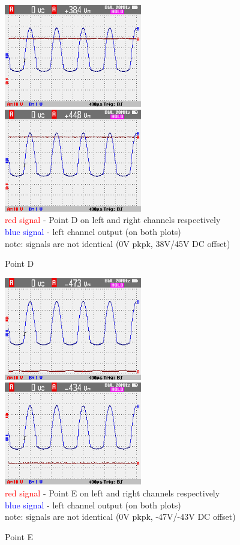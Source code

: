 \documentclass[a4paper,twoside,notitlepage]{article}
\begin{document}
\begin{figure}[hptb!]
    \centering
    \includegraphics[width=6cm]{img_report/left_point_D.png}
    \includegraphics[width=6cm]{img_report/right_point_D.png} \\ 
    \textcolor{Red}{red signal} - Point D on left and right channels respectively \\
    \textcolor{Blue}{blue signal} - left channel output (on both plots) \\
    note: signals are not identical (0V pkpk, 38V/45V DC offset)
 \caption{Point D}
 \label{fig:point-D}
\end{figure}

\begin{figure}[hptb!]
    \centering
    \includegraphics[width=6cm]{img_report/left_point_E.png}
    \includegraphics[width=6cm]{img_report/right_point_E.png} \\ 
    \textcolor{Red}{red signal} - Point E on left and right channels respectively \\
    \textcolor{Blue}{blue signal} - left channel output (on both plots) \\
    note: signals are not identical (0V pkpk, -47V/-43V DC offset)
 \caption{Point E}
 \label{fig:point-E}
\end{figure}
\end{document}
